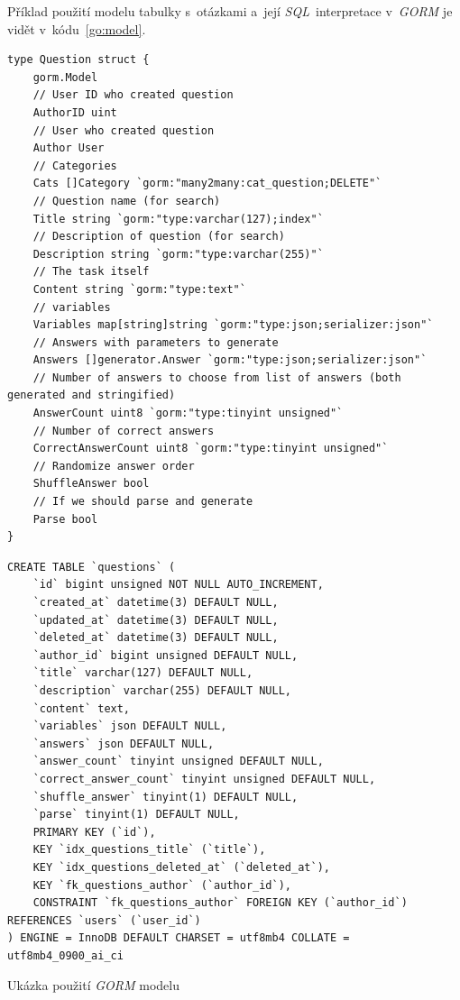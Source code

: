 \documentclass[11pt,a4paper]{report}
\let\oldacrshort\acrshort
\renewcommand{\acrshort}[1]{\emph{\normalsize\color[rgb]{0,0,0}\noindent\oldacrshort{#1}}}
\begin{document}
            Příklad použití modelu tabulky s~otázkami a~její \acrshort{SQL}~interpretace v~\emph{GORM} je vidět v~kódu~\ref{go:model}.

            \begin{code}
                \begin{minipage}[t]{1\linewidth}
                    \begin{verbatim}
type Question struct {
	gorm.Model
	// User ID who created question
	AuthorID uint
	// User who created question
	Author User
	// Categories
	Cats []Category `gorm:"many2many:cat_question;DELETE"`
	// Question name (for search)
	Title string `gorm:"type:varchar(127);index"`
	// Description of question (for search)
	Description string `gorm:"type:varchar(255)"`
	// The task itself
	Content string `gorm:"type:text"`
	// variables
	Variables map[string]string `gorm:"type:json;serializer:json"`
	// Answers with parameters to generate
	Answers []generator.Answer `gorm:"type:json;serializer:json"`
	// Number of answers to choose from list of answers (both generated and stringified)
	AnswerCount uint8 `gorm:"type:tinyint unsigned"`
	// Number of correct answers
	CorrectAnswerCount uint8 `gorm:"type:tinyint unsigned"`
	// Randomize answer order
	ShuffleAnswer bool
	// If we should parse and generate
	Parse bool
}
                    \end{verbatim}
                \end{minipage}
                \hfill
                \begin{minipage}[t]{1\linewidth}
                    \begin{verbatim}
CREATE TABLE `questions` (
    `id` bigint unsigned NOT NULL AUTO_INCREMENT,
    `created_at` datetime(3) DEFAULT NULL,
    `updated_at` datetime(3) DEFAULT NULL,
    `deleted_at` datetime(3) DEFAULT NULL,
    `author_id` bigint unsigned DEFAULT NULL,
    `title` varchar(127) DEFAULT NULL,
    `description` varchar(255) DEFAULT NULL,
    `content` text,
    `variables` json DEFAULT NULL,
    `answers` json DEFAULT NULL,
    `answer_count` tinyint unsigned DEFAULT NULL,
    `correct_answer_count` tinyint unsigned DEFAULT NULL,
    `shuffle_answer` tinyint(1) DEFAULT NULL,
    `parse` tinyint(1) DEFAULT NULL,
    PRIMARY KEY (`id`),
    KEY `idx_questions_title` (`title`),
    KEY `idx_questions_deleted_at` (`deleted_at`),
    KEY `fk_questions_author` (`author_id`),
    CONSTRAINT `fk_questions_author` FOREIGN KEY (`author_id`) REFERENCES `users` (`user_id`)
) ENGINE = InnoDB DEFAULT CHARSET = utf8mb4 COLLATE = utf8mb4_0900_ai_ci
                    \end{verbatim}
                \end{minipage}
                \caption{Ukázka použití \emph{GORM} modelu}
                \label{go:model}
            \end{code}
\end{document}
